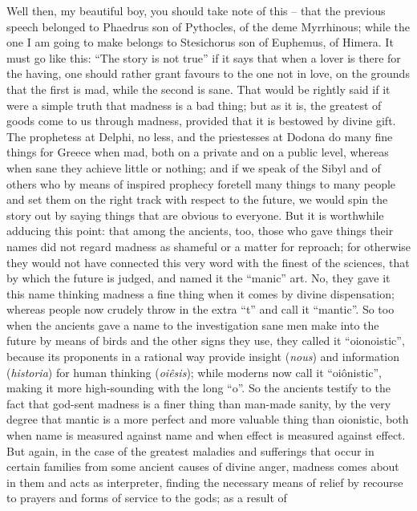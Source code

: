 Well then, my beautiful boy, you should take note of this --
that the previous speech belonged to Phaedrus son of 
Pythocles, of the deme Myrrhinous; while the one I am going to make
belongs to Stesichorus son of Euphemus, of
Himera. It must go like
this: “The story is not true” if it says that when a lover is there for
the having, one should rather grant favours to the one not in love, on
the grounds that the first is mad,  while the second is sane.
That would be rightly said if it were a simple truth that madness is a
bad thing; but as it is, the greatest of goods come to us through
madness, provided that it is bestowed by divine gift. The prophetess at
Delphi, no less, and the priestesses at Dodona do many fine things for
Greece  when mad, both on a private and on a public level,
whereas when sane they achieve little or nothing; and if we speak of the
Sibyl and of others who by means of inspired prophecy foretell 
many things to many people and set them on the right track with respect
to the future, we would spin the story out by saying things that are
obvious to everyone. But it is worthwhile adducing this point: that
among the ancients, too, those who gave things their names did not
regard madness as shameful  or a matter for reproach; for
otherwise they would not have connected this very word with the finest
of the sciences, that by which the future is judged, and named it the
“manic” art. No, they gave it this name thinking madness a fine thing
when it comes by divine dispensation; whereas people now crudely
 throw in the extra “t” and call it
“mantic”. So too when the
ancients gave a name to the investigation sane men make into the future
by means of birds and the other signs they use, they called it
“oionoistic”, because its proponents in a rational way provide insight
({\em nous}) and information ({\em historia}) for human 
thinking ({\em oiêsis}); while moderns now call it “oiônistic”, making
it more high-sounding with the long “o”. So the ancients testify to the
fact that god-sent madness is a finer thing than man-made sanity, by the
very degree that mantic is a more perfect and more valuable thing than
oionistic, both when name is  measured against name and when
effect is measured against effect. But again, in the case of the
greatest maladies and sufferings that occur in certain families from
some ancient causes of divine anger, madness comes about in them and
acts as  interpreter, finding the necessary means of relief by
recourse to prayers and forms of service to the gods; as a result of
